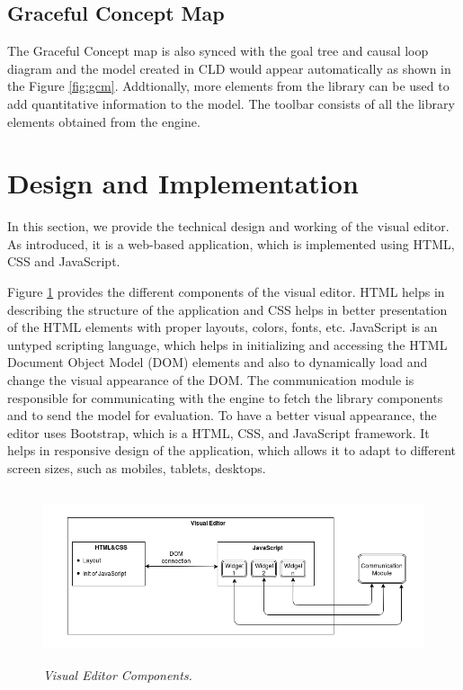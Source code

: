 \documentclass[a4paper]{article}
\begin{document}
\subsection{Graceful Concept Map}

The Graceful Concept map is also synced with the goal tree and causal loop diagram and the model created in CLD would appear automatically as shown in the Figure \ref{fig:gcm}. Addtionally, more elements from the library can be used to add quantitative information to the model. The toolbar consists of all the library elements obtained from the engine.

\newpage

\section{Design and Implementation}
\label{implementation}

In this section, we provide the technical design and working of the visual editor. As introduced, it is a web-based application, which is implemented using HTML, CSS and JavaScript.  

Figure \ref{fig:visual} provides the different components of the visual editor. HTML helps in describing the structure of the application and CSS helps in better presentation of the HTML elements with proper layouts, colors, fonts, etc. JavaScript is an untyped scripting language, which helps in initializing and accessing the HTML Document Object Model (DOM) elements and also to dynamically load and change the visual appearance of the DOM. The communication module is responsible for communicating with the engine to fetch the library components and to send the model for evaluation. To have a better visual appearance, the editor uses Bootstrap, which is a HTML, CSS, and JavaScript framework. It helps in responsive design of the application, which allows it to adapt to different screen sizes, such as mobiles, tablets, desktops.

\begin{figure}
\begin{center}
\includegraphics[height=2in,width=5in]{img/visual.png}
\caption{\small \sl Visual Editor Components.\label{fig:visual}}
\end{center}
\end{figure}
\end{document}
